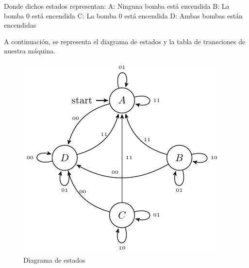 Donde dichos estados representan:\newline
 A: Ninguna bomba está encendida \newline
 B: La bomba 0 está encendida \newline
 C: La bomba 0 está encendida \newline
 D: Ambas bombas están encendidas \newline
 \par
 
 A continuación, se representa el diagrama de estados y la tabla de transciones de nuestra máquina.
 
 \begin{figure}[H]
\begin{center}
\includegraphics[scale=0.9]{Ejercicio1/Diagramas/Transiciones}
\caption{Diagrama de estados}
\end{center}
\label{Diagrama_de_estados}
\end{figure}




